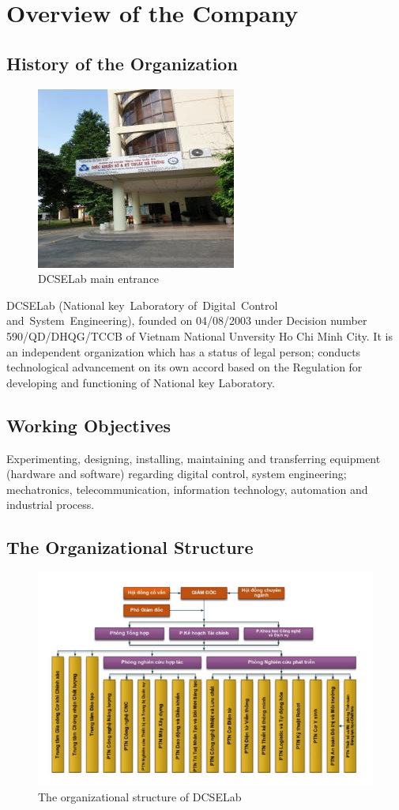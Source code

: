 \chapter{Overview of the Company}
\section{History of the Organization }
\begin{figure}[h]
	\centering
	\includegraphics[width=0.6\linewidth]{01}
	\caption{DCSELab main entrance}
	\label{fig:01}
\end{figure}
DCSELab (National key Laboratory of Digital Control and System Engineering), founded on 04/08/2003 under Decision number 590/QD/DHQG/TCCB of Vietnam National Unversity Ho Chi Minh City. It is an independent organization which has a status of legal person; conducts technological advancement on its own accord based on the Regulation for developing and functioning of National key Laboratory.

\section{Working Objectives}
Experimenting, designing, installing, maintaining and transferring equipment (hardware and software) regarding digital control, system engineering; mechatronics, telecommunication, information technology, automation and industrial process.
\section{The Organizational Structure}
\begin{figure}[ht]
	\centering
	\includegraphics[width=0.7\linewidth]{02}
	\caption{The organizational structure of DCSELab}
	\label{fig:02}
\end{figure}
